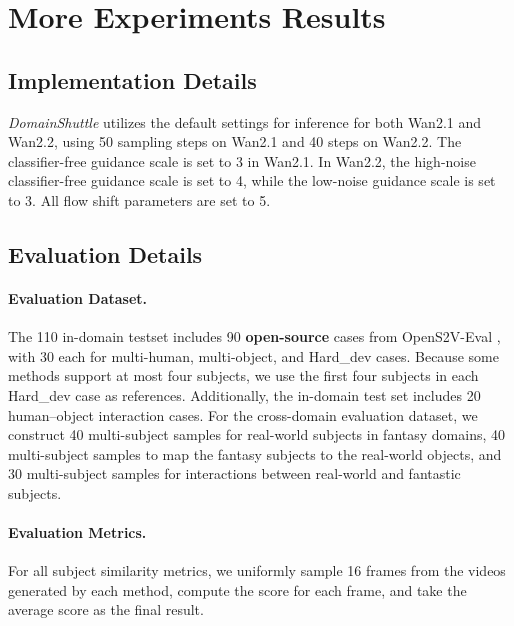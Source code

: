 \documentclass{llmxive}
\begin{document}
\section{More Experiments Results}

\label{Experiments_Results}

\subsection{Implementation Details}

\textit{DomainShuttle} utilizes the default settings for inference for both Wan2.1 and Wan2.2, using 50 sampling steps on Wan2.1 and 40 steps on Wan2.2. The classifier-free guidance scale is set to 3 in Wan2.1. In Wan2.2, the high-noise classifier-free guidance scale is set to 4, while the low-noise guidance scale is set to 3. All flow shift parameters are set to 5.



\subsection{Evaluation Details}

\paragraph{\textbf{Evaluation Dataset.}} The 110 in-domain testset includes 90 \textbf{open-source} cases from OpenS2V-Eval \cite{yuan2025opens2v}, with 30 each for multi-human, multi-object, and Hard\_dev cases. Because some methods support at most four subjects, we use the first four subjects in each Hard\_dev case as references. Additionally, the in-domain test set includes 20 human–object interaction cases. For the cross-domain evaluation dataset, we construct 40 multi-subject samples for real-world subjects in fantasy domains, 40 multi-subject samples to map the fantasy subjects to the real-world objects, and 30 multi-subject samples for interactions between real-world and fantastic subjects.




\paragraph{\textbf{Evaluation Metrics.}} For all subject similarity metrics, we uniformly sample 16 frames from the videos generated by each method, compute the score for each frame, and take the average score as the final result.
\end{document}
